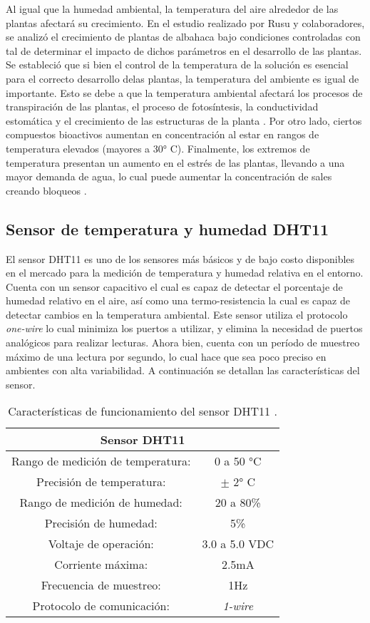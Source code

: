 Al igual que la humedad ambiental, la temperatura del aire alrededor de las plantas afectará su crecimiento. En el estudio realizado por Rusu y colaboradores, se analizó el crecimiento de plantas de albahaca bajo condiciones controladas con tal de determinar el impacto de dichos parámetros en el desarrollo de las plantas. Se estableció que si bien el control de la temperatura de la solución es esencial para el correcto desarrollo delas plantas, la temperatura del ambiente es igual de importante. Esto se debe a que la temperatura ambiental afectará los procesos de transpiración de las plantas, el proceso de fotosíntesis, la conductividad estomática y el crecimiento de las estructuras de la planta \cite{rusu_overview_2021}. Por otro lado, ciertos compuestos bioactivos aumentan en concentración al estar en rangos de temperatura elevados (mayores a 30° C). Finalmente, los extremos de temperatura presentan un aumento en el estrés de las plantas, llevando a una mayor demanda de agua, lo cual puede aumentar la concentración de sales creando bloqueos \cite{bita_plant_2013}. 

\subsection{Sensor de temperatura y humedad DHT11}
El sensor DHT11 es uno de los sensores más básicos y de bajo costo disponibles en el mercado para la medición de temperatura y humedad relativa en el entorno. Cuenta con un sensor capacitivo el cual es capaz de detectar el porcentaje de humedad relativo en el aire, así como una termo-resistencia la cual es capaz de detectar cambios en la temperatura ambiental. \cite{adafruit_dht11} Este sensor utiliza el protocolo \textit{one-wire} lo cual minimiza los puertos a utilizar, y elimina la necesidad de puertos analógicos para realizar lecturas. Ahora bien, cuenta con un período de muestreo máximo de una lectura por segundo, lo cual hace que sea poco preciso en ambientes con alta variabilidad. A continuación se detallan las características del sensor.

\begin{table}[H]
	\centering
	\begin{tabular}{|c|c|}
		\hline
		\multicolumn{2}{|c|}{\textbf{Sensor DHT11}}\\ \hline
		Rango de medición de temperatura: & 0 a 50 °C \\ \hline
		Precisión de temperatura: & $\pm$ 2° C \\ \hline
		Rango de medición de humedad: & 20 a 80\% \\ \hline
		Precisión de humedad: & 5\% \\ \hline
		Voltaje de operación: & 3.0 a 5.0 VDC \\ \hline
		Corriente máxima: & 2.5mA \\ \hline
		Frecuencia de muestreo: & 1Hz \\ \hline
		Protocolo de comunicación: & \textit{1-wire} \\ \hline
	\end{tabular}
	\caption{Características de funcionamiento del sensor DHT11 \cite{adafruit_dht11}.}
	\label{Cuadro5}
\end{table}


